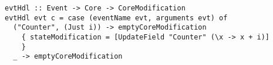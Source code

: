 \begin{verbatim}
evtHdl :: Event -> Core -> CoreModification
evtHdl evt c = case (eventName evt, arguments evt) of
  ("Counter", (Just i)) -> emptyCoreModification
    { stateModification = [UpdateField "Counter" (\x -> x + i)]
    }
  _ -> emptyCoreModification
\end{verbatim}
